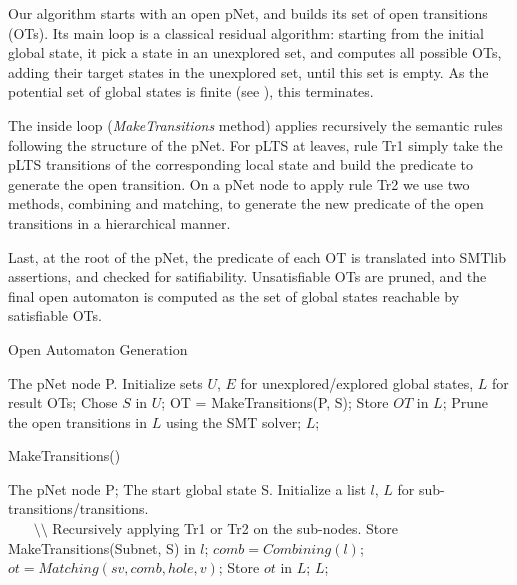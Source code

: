 \documentclass{lncs/llncs}
\begin{document}
Our algorithm starts with an open pNet, and builds its set of open
transitions (OTs). Its main loop is a classical residual algorithm: starting
from the initial global state, it pick a state in an unexplored set, and
computes all possible OTs, adding their target states in the
unexplored set, until this set is empty. As the potential set of
global states is finite (see \cite{henrio:Forte2016}), this terminates.

The inside loop (\emph{MakeTransitions} method) applies recursively
the semantic rules following the structure of the pNet. 
For pLTS at leaves, rule Tr1 simply take the pLTS transitions of the
corresponding local state and build the predicate to generate the
open transition. 
On a pNet node to apply rule Tr2 we use two methods, combining and
matching, to generate the new predicate of the open transitions in a
hierarchical manner.

Last, at the root of the pNet, the predicate of each OT is translated
into SMTlib assertions, and checked for satifiability. Unsatisfiable
OTs are pruned, and the final open automaton is computed as the set of
global states reachable by satisfiable OTs. 



\begin{algorithm}
\caption{Open Automaton Generation}
\begin{algorithmic}[1]
\Require The pNet node P.
\State Initialize sets $U$, $E$ for unexplored/explored global states, $L$ for result OTs;
	\State Chose $S$ in $U$;
	\State OT = MakeTransitions(P, S);
        \State Store $OT$ in $L$; 
	\EndFor
\EndWhile
\State Prune the open transitions in $L$ using the SMT solver;
\State \Return $L$;

\end{algorithmic}  
\end{algorithm}

\begin{algorithm}
\caption{MakeTransitions()}
\begin{algorithmic}[1]
\Require The pNet node P; The start global state S.
\State Initialize a list $l$, $L$ for sub-transitions/transitions.
	\\ ~~~ $\setminus \setminus$ Recursively applying Tr1 or Tr2 on the sub-nodes.
                \State Store MakeTransitions(Subnet, S) in $l$;
	\EndFor
		\State $comb = Combining(l)$;
                 \State $ot = Matching(sv, comb, hole, v)$;
                 \State Store $ot$ in $L$; 
	\EndFor
\State \Return $L$;
\end{algorithmic}  
\end{algorithm}
\end{document}
